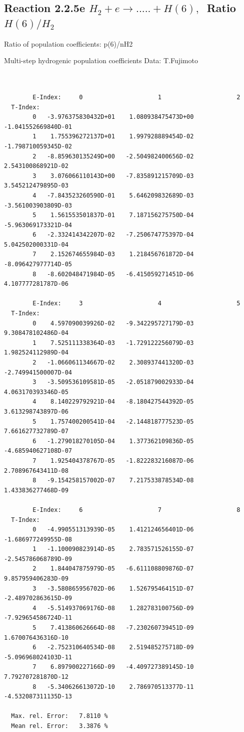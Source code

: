 \documentclass[12pt,dvips]{article}
\begin{document}
\newpage
\subsection{
Reaction 2.2.5e  $H_2 + e \rightarrow .....+H(6)   , \  $
Ratio $H(6)/H_2 $
}

 Ratio of population coefficients: p(6)/nH2

 Multi-step hydrogenic population coefficients
 Data: T.Fujimoto


\begin{small}\begin{verbatim}


        E-Index:     0                     1                     2
  T-Index:
        0   -3.976375830432D+01    1.080938475473D+00   -1.041552669840D-01
        1    1.755396272137D+01    1.997928889454D-02   -1.798710059345D-02
        2   -8.859630135249D+00   -2.504982400656D-02    2.543100868921D-02
        3    3.076066110143D+00   -7.835891215709D-03    3.545212479895D-03
        4   -7.843523260590D-01    5.646209832689D-03   -3.561003903809D-03
        5    1.561553501837D-01    7.187156275750D-04   -5.963069173321D-04
        6   -2.332414342207D-02   -7.250674775397D-04    5.042502000331D-04
        7    2.152674655984D-03    1.218456761872D-04   -8.096427977714D-05
        8   -8.602048471984D-05   -6.415059271451D-06    4.107777281787D-06

        E-Index:     3                     4                     5
  T-Index:
        0    4.597090039926D-02   -9.342295727179D-03    9.308478102486D-04
        1    7.525111338364D-03   -1.729122256079D-03    1.982524112989D-04
        2   -1.066061134667D-02    2.308937441320D-03   -2.749941500007D-04
        3   -3.509536109581D-05   -2.051879002933D-04    4.063170393346D-05
        4    8.140229792921D-04   -8.180427544392D-05    3.613298743897D-06
        5    1.757400200541D-04   -2.144818777523D-05    7.661627732789D-07
        6   -1.279018270105D-04    1.377362109836D-05   -4.685940627108D-07
        7    1.925404378767D-05   -1.822283216087D-06    2.708967643411D-08
        8   -9.154258157002D-07    7.217533878534D-08    1.433836277468D-09

        E-Index:     6                     7                     8
  T-Index:
        0   -4.990551313939D-05    1.412124656401D-06   -1.686977249955D-08
        1   -1.100090823914D-05    2.783571526155D-07   -2.545786068789D-09
        2    1.844047875979D-05   -6.611108809876D-07    9.857959406283D-09
        3   -3.580865956702D-06    1.526795464151D-07   -2.489702863615D-09
        4   -5.514937069176D-08    1.282783100756D-09   -7.929654586724D-11
        5    7.413860626664D-08   -7.230260739451D-09    1.670076436316D-10
        6   -2.752310640534D-08    2.519485275718D-09   -5.096968024103D-11
        7    6.897900227166D-09   -4.409727389145D-10    7.792707281870D-12
        8   -5.340626613072D-10    2.786970513377D-11   -4.532087311135D-13

  Max. rel. Error:   7.8110 %
  Mean rel. Error:   3.3876 %

\end{verbatim}\end{small}
\end{document}
